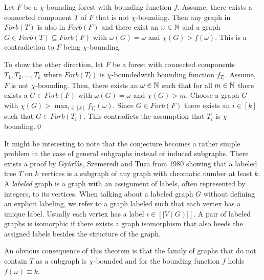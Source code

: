 \begin{prf}
Let $F$ be a $\chi$-bounding forest with bounding function $f$. Assume, there exists a connected component $T$ of $F$ that is not $\chi$-bounding. Then any graph in $\textit{Forb}(T)$ is also in $\textit{Forb}(F)$ and there exist an $\omega \in\mathbb{N}$ and a graph $G\in\textit{Forb}(T)\subseteq\textit{Forb}(F)$ with $\omega (G) =\omega $ and $\chi (G)>f(\omega )$. This is a contradiction to $F$ being $\chi$-bounding.

To show the other direction, let $F$ be a forest with connected components $T_1, T_2,\dots ,T_k$ where $\textit{Forb}	(T_i)$ is $\chi$-boundedwith bounding function $f_{T_i}$. Assume, $F$ is not $\chi$-bounding. Then, there exists an $\omega\in\mathbb{N}$ such that for all $m\in\mathbb{N}$ there exists a $G\in\textit{Forb}(F)$ with $\omega (G)=\omega$ and $\chi (G)> m$. Choose a graph $G$ with $\chi (G)>\max_{i\in [k]}f_{T_i}(\omega)$. Since $G\in\textit{Forb}(F)$ there exists an $i\in [k]$ such that $G\in\textit{Forb}(T_i)$. This contradicts the assumption that $T_i$ is $\chi$-bounding.\qed
\end{prf}

It might be interesting to note that the conjecture becomes a rather simple problem in the case of general subgraphs instead of induced subgraphs. There exists a proof by Gyárfás, Szemeredi and Tuza from 1980 \cite{GST80} showing that a labeled tree $T$ on $k$ vertices is a subgraph of any graph with chromatic number at least $k$. A \textit{labeled} graph is a graph with an assignment of labels, often represented by integers, to its vertices. When talking about a labeled graph $G$ without defining an explicit labeling, we refer to a graph labeled such that each vertex has a unique label. Usually each vertex has a label $i\in [\vert V(G)\vert ]$. A pair of labeled graphs is isomorphic if there exists a graph isomorphism that also heeds the assigned labels besides the structure of the graph.

An obvious consequence of this theorem is that the family of graphs that do not contain $T$ as a subgraph is $\chi$-bounded and for the bounding function $f$ holds $f(\omega )\equiv k$.

